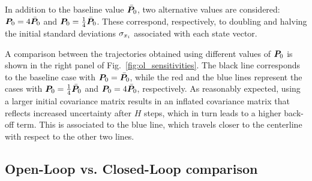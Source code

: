 In addition to the baseline value $\bar{\boldsymbol{P}}_0$, two alternative values are considered: $\boldsymbol{P}_0 = 4\bar{\boldsymbol{P}}_0$ and $\boldsymbol{P}_0 = \frac{1}{4}\bar{\boldsymbol{P}}_0$. These correspond, respectively, to doubling and halving the initial standard deviations $\sigma_{x_i}$ associated with each state vector.

A comparison between the trajectories obtained using different values of $\boldsymbol{P}_0$ is shown in the right panel of Fig.~\ref{fig:ol_sensitivities}.
The black line corresponds to the baseline case with $\boldsymbol{P}_0 = \bar{\boldsymbol{P}}_0$, while the red and the blue lines represent the cases with $\boldsymbol{P}_0 = \frac{1}{4}\bar{\boldsymbol{P}}_0$ and $\boldsymbol{P}_0 = 4\bar{\boldsymbol{P}}_0$, respectively. As reasonably expected, using a larger initial covariance matrix results in an inflated covariance matrix that reflects increased uncertainty after $H$ steps, which in turn leads to a higher back-off term. This is associated to the blue line, which travels closer to the centerline with respect to the other two lines.

\subsection{Open-Loop vs. Closed-Loop comparison}

